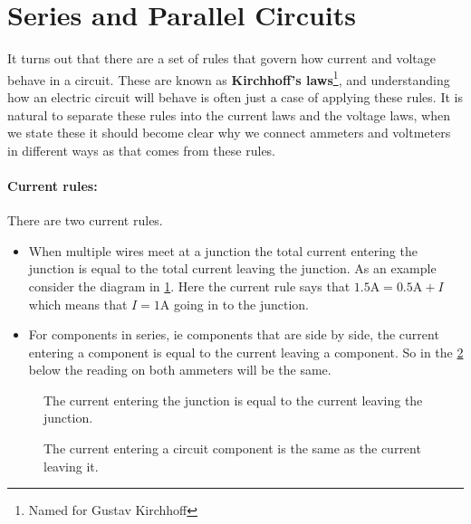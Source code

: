 \section{Series and Parallel Circuits}
It turns out that there are a set of rules that govern how current and voltage behave in a circuit. These are known as \textbf{Kirchhoff's laws}\footnote{Named for Gustav Kirchhoff}, and understanding how an electric circuit will behave is often just a case of applying these rules. It is natural to separate these rules into the current laws and the voltage laws, when we state these it should become clear why we connect ammeters and voltmeters in different ways as that comes from these rules. \\

\paragraph{Current rules:} There are two current rules.
\begin{itemize}
\setlength{\itemsep}{-5pt}
    \item[1)] When multiple wires meet at a junction the total current entering the junction is equal to the total current leaving the junction. As an example consider the diagram in \cref{fig: K1}. Here the current rule says that $1.5\text{A}=0.5\text{A}+I$ which means that $I=1\text{A}$ going in to the junction.
    \item[2)] For components in series, ie components that are side by side, the current entering a component is equal to the current leaving a component. So in the \cref{fig: K2} below the reading on both ammeters will be the same.
\end{itemize}
   \begin{figure}[ht]
    \centering
    \caption{The current entering the junction is equal to the current leaving the junction.}
    \label{fig: K1}
\end{figure}

 \begin{figure}[ht]
    \centering
    \caption{The current entering a circuit component is the same as the current leaving it.}
    \label{fig: K2}
\end{figure}

